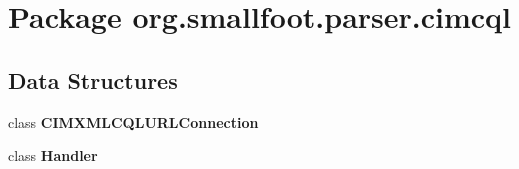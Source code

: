 \section{Package org.\+smallfoot.\+parser.\+cimcql}
\label{namespaceorg_1_1smallfoot_1_1parser_1_1cimcql}
\subsection*{Data Structures}
\begin{DoxyCompactItemize}
\item 
class {\bf C\+I\+M\+X\+M\+L\+C\+Q\+L\+U\+R\+L\+Connection}
\item 
class {\bf Handler}
\end{DoxyCompactItemize}
